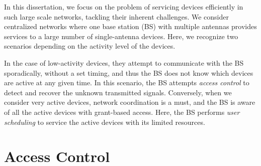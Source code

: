 

%
%
%


In this dissertation, we focus on the problem of servicing devices efficiently in such large scale networks, tackling their inherent challenges. We consider centralized networks where one base station (BS) with multiple antennas provides services to a large number of single-antenna devices. Here, we recognize two scenarios depending on the activity level of the devices. 

In the case of low-activity devices, they attempt to communicate with the BS sporadically, without a set timing, and thus the BS does not know which devices are active at any given time. In this scenario, the BS attempts \textit{access control} to detect and recover the unknown transmitted signals.
Conversely, when we consider very active devices, network coordination is a must, and the BS is aware of all the active devices with grant-based access. Here, the BS performs \textit{user scheduling} to service the active devices with its limited resources.


\section{Access Control}

